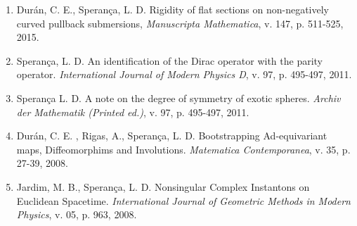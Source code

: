 \documentclass[10pt]{article}
\begin{document}
\begin{enumerate}
	
	\item Durán, C. E., Sperança, L. D. Rigidity of flat sections on non-negatively curved pullback submersions, \textit{Manuscripta Mathematica}, v. 147, p. 511-525, 2015.
	
	
	\item Sperança, L. D. An identification of the Dirac operator with the parity operator. \textit{International Journal of Modern Physics D},  v. 97, p. 495-497, 2011.
	
	
	
	\item Sperança L. D. A note on the degree of symmetry of exotic spheres. \textit{Archiv der Mathematik (Printed ed.)},  v. 97, p. 495-497, 2011.
	
	
	\item Durán, C. E. , Rigas, A., Sperança, L. D.  Bootstrapping Ad-equivariant maps, Diffeomorphims and Involutions. \textit{Matematica Contemporanea},  v. 35, p. 27-39, 2008.
	
	\item Jardim, M. B., Sperança, L. D. Nonsingular Complex Instantons on Euclidean Spacetime. \textit{International Journal of Geometric Methods in Modern Physics}, v. 05, p. 963, 2008.
	
\end{enumerate}
\end{document}
